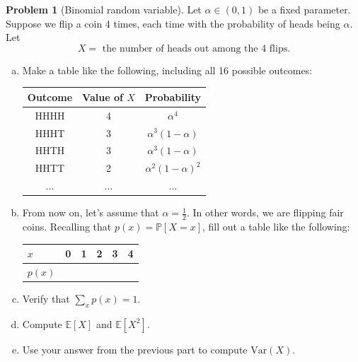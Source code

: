 \documentclass[10pt]{article}
\theoremstyle{definition}
\newtheorem{problem}[theorem]{Problem}
\newcommand{\1}[1]{\textbf{1}_{\left[#1\right]}} %
\def\E{\mathbb{E}} %
\def\P{\mathbb{P}} %
\begin{document}
\begin{problem}[Binomial random variable]
  Let $\alpha\in (0,1)$ be a fixed parameter. Suppose we flip a coin 4 times, each time with the probability
  of heads being $\alpha$. Let
  \begin{equation*}
    X = \text{ the number of heads out among the 4 flips.}
  \end{equation*}
  \begin{enumerate}[(a)]
    \item  Make a table like the following, including all 16 possible outcomes:
    \begin{table}[htb]
      \centering
        \begin{tabular}{|c|c|c|}
          \hline
          \textbf{Outcome} & \textbf{Value of }$X$ & \textbf{Probability} \\ \hline
          HHHH & 4 & $\alpha^{4} $ \\ \hline
          HHHT & 3 & $\alpha^{3}(1-\alpha) $ \\ \hline
          HHTH & 3 & $\alpha^{3}(1-\alpha) $ \\ \hline
          HHTT & 2 & $\alpha^{2}(1-\alpha)^{2} $ \\ \hline
          ... &... & ... \\ \hline
        \end{tabular}
    \end{table}
    
    \item From now on, let's assume that $\alpha=\frac{1}{2}$. In other words, we are flipping fair
    coins. Recalling that $p(x) = \P\left[X=x \right]$, fill out a table like the following:
    \begin{center}
      \begin{tabular}{|l|l|l|l|l|l|}
        \hline
        $x$    & 0 & 1 & 2 & 3 & 4 \\ \hline
        $p(x)$ &   &   &   &   &   \\ \hline
      \end{tabular}
    \end{center}
    \item Verify that $\sum_{x}p(x) =1.$
    \item Compute $\E\left[X \right]$ and $\E\left[X^{2} \right]$.
    \item Use your answer from the previous part to compute $\text{Var}(X)$.
  \end{enumerate} 
\end{problem}
\end{document}
